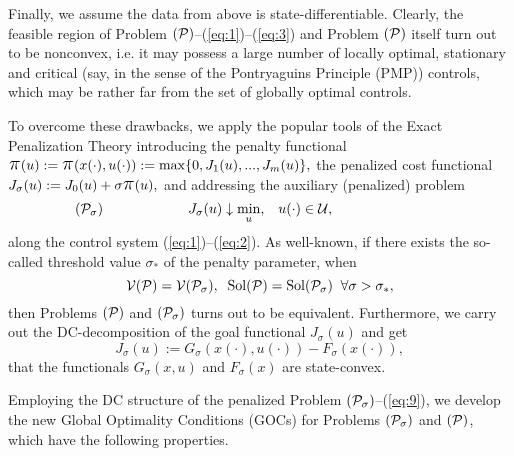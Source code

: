 \documentclass[12pt]{llncs}
\begin{document}
Finally, we assume the data from above is state-differentiable. Clearly, the feasible region of Problem $({\cal P})$--(\ref{eq:1})--(\ref{eq:3})
and Problem $({\cal P})$ itself turn out to be nonconvex, i.e. it may possess a large number of locally optimal, stationary and critical (say, in the sense of the Pontryaguins Principle (PMP)) controls, which may be rather far from the set of globally optimal controls.

To overcome these drawbacks, we apply the popular tools of the Exact Penalization Theory  %
introducing the penalty functional
$\mbox{\Large $\pi$}(u):=\mbox{\Large $\pi$}(x(\cdot),u(\cdot)):=\max\{0,J_1(u),...,J_m(u)\},$
 the penalized cost functional
$J_\sigma (u) := J_0 (u)+\sigma\mbox{\Large $\pi$}(u),$
and addressing the auxiliary (penalized) problem
\begin{equation}\label{eq:9}
   \lefteqn{\hspace{-2.85cm}({\cal P}_\sigma)}
J_\sigma (u)  \downarrow \min\limits_u, \;\;\; u(\cdot) \in {\cal U},
\end{equation}
along the control system (\ref{eq:1})--(\ref{eq:2}). As well-known, if there exists the so-called threshold value $\sigma_*$ of the penalty parameter, when %
\begin{equation}\label{eq:10}
{\cal V}({\cal P})={\cal V}({\cal P}_\sigma),\;\; {\rm Sol}({\cal P})={\rm Sol}({\cal P}_\sigma)\;\;\forall \sigma > \sigma_*,
\end{equation}
then  Problems $({\cal P})$ and $({\cal P}_\sigma)$ turns out to be equivalent. Furthermore, we carry out the DC-decomposition of the goal  functional $J_\sigma(u)$ and get
  \begin{equation}\label{eq:11}
	J_\sigma (u):=G_\sigma (x(\cdot),u(\cdot))-F_\sigma (x(\cdot)),
\end{equation}
that the functionals $G_\sigma(x,u)$ and $F_\sigma(x)$ are state-convex.

Employing the
DC structure of the penalized Problem $({\cal P}_\sigma)$--(\ref{eq:9}), we develop the new Global Optimality Conditions (GOCs) for Problems $({\cal P}_\sigma)$ and $({\cal P})$, which have the following properties.
\end{document}
